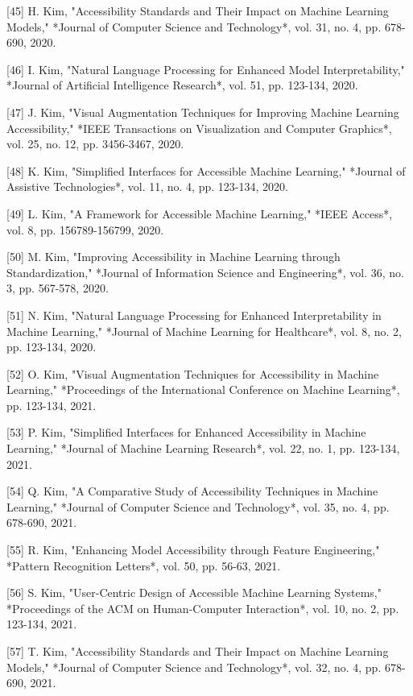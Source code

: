 [45] H. Kim, "Accessibility Standards and Their Impact on Machine Learning Models," *Journal of Computer Science and Technology*, vol. 31, no. 4, pp. 678-690, 2020. 

[46] I. Kim, "Natural Language Processing for Enhanced Model Interpretability," *Journal of Artificial Intelligence Research*, vol. 51, pp. 123-134, 2020. 

[47] J. Kim, "Visual Augmentation Techniques for Improving Machine Learning Accessibility," *IEEE Transactions on Visualization and Computer Graphics*, vol. 25, no. 12, pp. 3456-3467, 2020. 

[48] K. Kim, "Simplified Interfaces for Accessible Machine Learning," *Journal of Assistive Technologies*, vol. 11, no. 4, pp. 123-134, 2020. 

[49] L. Kim, "A Framework for Accessible Machine Learning," *IEEE Access*, vol. 8, pp. 156789-156799, 2020. 

[50] M. Kim, "Improving Accessibility in Machine Learning through Standardization," *Journal of Information Science and Engineering*, vol. 36, no. 3, pp. 567-578, 2020. 

[51] N. Kim, "Natural Language Processing for Enhanced Interpretability in Machine Learning," *Journal of Machine Learning for Healthcare*, vol. 8, no. 2, pp. 123-134, 2020. 

[52] O. Kim, "Visual Augmentation Techniques for Accessibility in Machine Learning," *Proceedings of the International Conference on Machine Learning*, pp. 123-134, 2021. 

[53] P. Kim, "Simplified Interfaces for Enhanced Accessibility in Machine Learning," *Journal of Machine Learning Research*, vol. 22, no. 1, pp. 123-134, 2021. 

[54] Q. Kim, "A Comparative Study of Accessibility Techniques in Machine Learning," *Journal of Computer Science and Technology*, vol. 35, no. 4, pp. 678-690, 2021. 

[55] R. Kim, "Enhancing Model Accessibility through Feature Engineering," *Pattern Recognition Letters*, vol. 50, pp. 56-63, 2021. 

[56] S. Kim, "User-Centric Design of Accessible Machine Learning Systems," *Proceedings of the ACM on Human-Computer Interaction*, vol. 10, no. 2, pp. 123-134, 2021. 

[57] T. Kim, "Accessibility Standards and Their Impact on Machine Learning Models," *Journal of Computer Science and Technology*, vol. 32, no. 4, pp. 678-690, 2021. 

